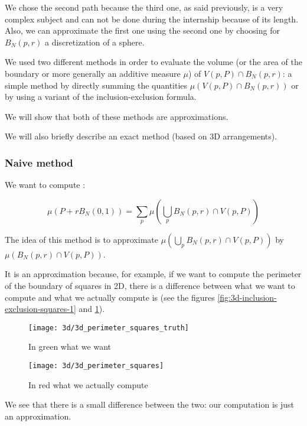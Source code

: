 We chose the second path because the third one, as said previously, is a very
complex subject and can not be done during the internship because of its length.
Also, we can approximate the first one using the second one by choosing for $
B_N(p, r) $ a discretization of a sphere.

We used two different methods in order to evaluate the volume (or the area of
the boundary or more generally an additive measure $ \mu $) of $ V(p, P) \cap
B_N(p, r) $: a simple method by directly summing the quantities $ \mu(V(p, P)
\cap B_N(p, r)) $ or by using a variant of the inclusion-exclusion formula.

We will show that both of these methods are approximations.

We will also briefly describe an exact method (based on 3D arrangements).

\subsubsection{Naive method}

We want to compute :

$$ \mu(P + r B_N(0, 1)) = \sum_p \mu(\bigcup_p B_N(p, r) \cap V(p, P)) $$

The idea of this method is to approximate $ \mu(\bigcup_p B_N(p, r) \cap V(p,
P)) $ by $ \mu(B_N(p, r) \cap V(p, P)) $.

It is an approximation because, for example, if we want to compute the perimeter
of the boundary of squares in 2D, there is a difference between what we want to compute
and what we actually compute is (see the figures \ref{fig:3d-inclusion-exclusion-squares-1}
and \ref{fig:3d-inclusion-exclusion-squares-2}).

\begin{figure}[h]
    \centering

    \texttt{[image: 3d/3d\_perimeter\_squares\_truth]}
    \caption{In green what we want}
    \label{fig:3d-inclusion-exclusion-squares-1}

    \texttt{[image: 3d/3d\_perimeter\_squares]}
    \caption{In red what we actually compute}
    \label{fig:3d-inclusion-exclusion-squares-2}
\end{figure}

We see that there is a small difference between the two: our computation is just
an approximation.


